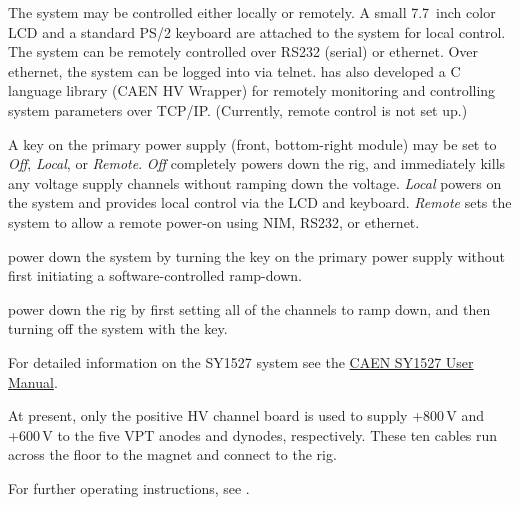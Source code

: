 The system may be controlled either locally or remotely.  A small 7.7~inch color LCD and a standard PS/2 keyboard are attached to the system for local control.  The system can be remotely controlled over RS232 (serial) or ethernet.  Over ethernet, the system can be logged into via telnet.   has also developed a C language library (CAEN HV Wrapper) for remotely monitoring and controlling system parameters over TCP/IP.  (Currently, remote control is not set up.)

A key on the primary power supply (front, bottom-right module) may be set to \textit{Off}, \textit{Local}, or \textit{Remote}.  \textit{Off} completely powers down the rig, and immediately kills any voltage supply channels without ramping down the voltage.  \textit{Local} powers on the system and provides local control via the LCD and keyboard.  \textit{Remote} sets the system to allow a remote power-on using NIM, RS232, or ethernet.

\begin{pleasedonot} power down the system by turning the key on the primary power supply without first initiating a software-controlled ramp-down.\end{pleasedonot}

\begin{pleasedo} power down the rig by first setting all of the channels to ramp down, and then turning off the system with the key.\end{pleasedo}

\noindent
For detailed information on the SY1527 system see the \href{Manuals/CAEN sy1527usermanual_rev15}{CAEN SY1527 User Manual}.

At present, only the positive HV channel board is used to supply +800\,V and +600\,V to the five VPT anodes and dynodes, respectively.  These ten cables run across the floor to the magnet and connect to the rig.

For further operating instructions, see .

